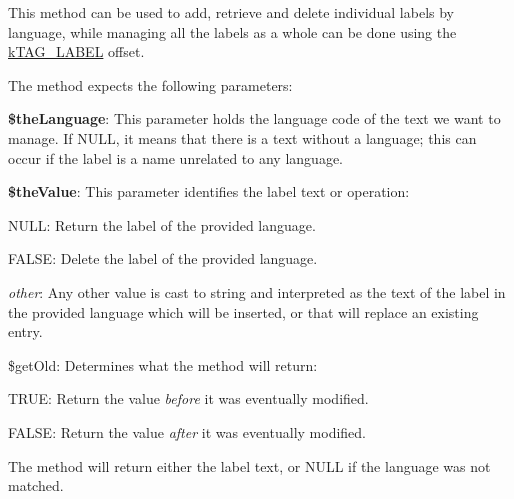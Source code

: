 This method can be used to add, retrieve and delete individual labels by language, while managing all the labels as a whole can be done using the \hyperlink{}{k\-T\-A\-G\-\_\-\-L\-A\-B\-E\-L} offset.

The method expects the following parameters\-:


\begin{DoxyItemize}
\item {\bfseries \$the\-Language}\-: This parameter holds the language code of the text we want to manage. If {\ttfamily N\-U\-L\-L}, it means that there is a text without a language; this can occur if the label is a name unrelated to any language. 
\item {\bfseries \$the\-Value}\-: This parameter identifies the label text or operation\-: 
\begin{DoxyItemize}
\item {\ttfamily N\-U\-L\-L}\-: Return the label of the provided language. 
\item {\ttfamily F\-A\-L\-S\-E}\-: Delete the label of the provided language. 
\item {\itshape other}\-: Any other value is cast to string and interpreted as the text of the label in the provided language which will be inserted, or that will replace an existing entry. 
\end{DoxyItemize}
\item {\ttfamily \$get\-Old}\-: Determines what the method will return\-: 
\begin{DoxyItemize}
\item {\ttfamily T\-R\-U\-E}\-: Return the value {\itshape before} it was eventually modified. 
\item {\ttfamily F\-A\-L\-S\-E}\-: Return the value {\itshape after} it was eventually modified. 
\end{DoxyItemize}
\end{DoxyItemize}

The method will return either the label text, or {\ttfamily N\-U\-L\-L} if the language was not matched.



